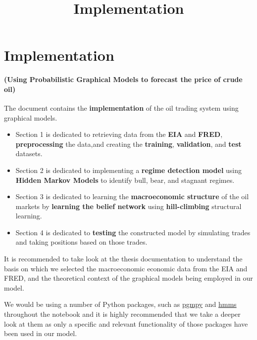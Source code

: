 \documentclass[11pt]{article}
\title{Implementation}
\providecommand{\tightlist}{%
      \setlength{\itemsep}{0pt}\setlength{\parskip}{0pt}}
\begin{document}
    
    
    \maketitle
    
    

    
    \hypertarget{implementation}{%
\section{Implementation}\label{implementation}}

\hypertarget{using-probabilistic-graphical-models-to-forecast-the-price-of-crude-oil}{%
\paragraph{(Using Probabilistic Graphical Models to forecast the price
of crude
oil)}\label{using-probabilistic-graphical-models-to-forecast-the-price-of-crude-oil}}

The document contains the \textbf{implementation} of the oil trading
system using graphical models.

\begin{itemize}
\tightlist
\item
  Section 1 is dedicated to retrieving data from the
  \textbf{EIA} and \textbf{FRED}, \textbf{preprocessing} the data,and
  creating the \textbf{training}, \textbf{validation}, and \textbf{test}
  datasets.
\item
  Section 2 is dedicated to implementing a \textbf{regime
  detection model} using \textbf{Hidden Markov Models} to identify bull,
  bear, and stagnant regimes.
\item
  Section 3 is dedicated to learning the \textbf{macroeconomic
  structure} of the oil markets by \textbf{learning the belief network}
  using \textbf{hill-climbing} structural learning.
\item
  Section 4 is dedicated to \textbf{testing} the constructed
  model by simulating trades and taking positions based on those trades.
\end{itemize}

It is recommended to take look at the thesis documentation to understand
the basis on which we selected the macroeconomic economic data from the
EIA and FRED, and the theoretical context of the graphical models being
employed in our model.

We would be using a number of Python packages, such as
\href{http://pgmpy.org/}{pgmpy} and
\href{https://github.com/lopatovsky/HMMs}{hmms} throughout the notebook
and it is highly recommended that we take a deeper look at them as only
a specific and relevant functionality of those packages have been used
in our model.
\end{document}
